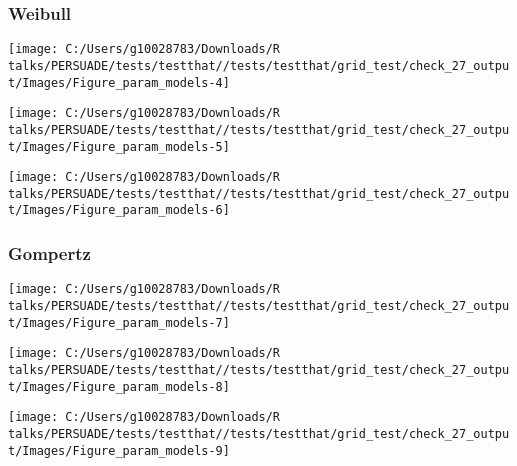\documentclass[
]{article}
\begin{document}
\clearpage

\subsubsection{Weibull}\label{weibull}

\begin{flushleft}\texttt{[image: C:/Users/g10028783/Downloads/R talks/PERSUADE/tests/testthat//tests/testthat/grid\_test/check\_27\_output/Images/Figure\_param\_models-4]} \end{flushleft}

\begin{flushleft}\texttt{[image: C:/Users/g10028783/Downloads/R talks/PERSUADE/tests/testthat//tests/testthat/grid\_test/check\_27\_output/Images/Figure\_param\_models-5]} \end{flushleft}

\begin{flushleft}\texttt{[image: C:/Users/g10028783/Downloads/R talks/PERSUADE/tests/testthat//tests/testthat/grid\_test/check\_27\_output/Images/Figure\_param\_models-6]} \end{flushleft}

\clearpage

\subsubsection{Gompertz}\label{gompertz}

\begin{flushleft}\texttt{[image: C:/Users/g10028783/Downloads/R talks/PERSUADE/tests/testthat//tests/testthat/grid\_test/check\_27\_output/Images/Figure\_param\_models-7]} \end{flushleft}

\begin{flushleft}\texttt{[image: C:/Users/g10028783/Downloads/R talks/PERSUADE/tests/testthat//tests/testthat/grid\_test/check\_27\_output/Images/Figure\_param\_models-8]} \end{flushleft}

\begin{flushleft}\texttt{[image: C:/Users/g10028783/Downloads/R talks/PERSUADE/tests/testthat//tests/testthat/grid\_test/check\_27\_output/Images/Figure\_param\_models-9]} \end{flushleft}

\clearpage
\end{document}

